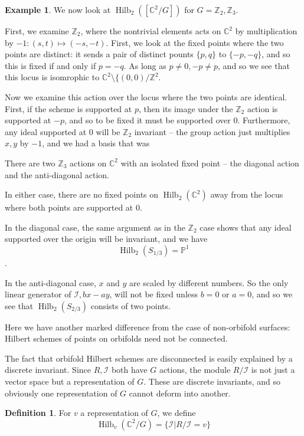 \documentclass{amsart}[12pt]
\theoremstyle{definition}
\newtheorem{example}[dummy]{Example}
\newtheorem{definition}[dummy]{Definition}
\newcommand{\Z}{\mathbb{Z}}
\newcommand{\C}{\mathbb{C}}
\newcommand{\proj}{\mathbb{P}}
\DeclareMathOperator{\Hilb}{Hilb}
\begin{document}
\begin{example}
We now look at $\Hilb_2([\C^2/G])$ for $G=\Z_2, \Z_3$.  

First, we examine $\Z_2$, where the nontrivial elements acts on $\C^2$ by multiplication by $-1: (s,t)\mapsto (-s,-t)$.  First, we look at the fixed points where the two points are distinct: it sends a pair of distinct pounts $\{p,q\}$ to $\{-p,-q\}$, and so this is fixed if and only if $p=-q$.  As long as $p\neq 0, -p\neq p$, and so we see that this locus is isomrophic to $\C^2\setminus\{(0,0)/\Z^2$.

Now we examine this action over the locus where the two points are identical.  First, if the scheme is supported at $p$, then its image under the $\Z_2$ action is supported at $-p$, and so to be fixed it must be supported over $0$.  Furthermore, any ideal supported at $0$ will be $\Z_2$ invariant -- the group action just multiplies $x, y$ by $-1$, and we had a basis that was

There are two $\Z_3$ actions on $\C^2$ with an isolated fixed point -- the diagonal action and the anti-diagonal action.

In either case, there are no fixed points on $\Hilb_2(\C^2)$ away from the locus where both points are supported at 0.  

In the diagonal case, the same argument as in the $\Z_2$ case shows that any ideal supported over the origin will be invariant, and we have
$$\Hilb_2(S_{1/3})=\proj^1$$.

In the anti-diagonal case, $x$ and $y$ are scaled by different numbers.  So the only linear generator of $\mathcal{I}, bx-ay$, will not be fixed unless $b=0$ or $a=0$, and so we see that $\Hilb_2(S_{2/3})$ consists of two points.  

Here we have another marked difference from the case of non-orbifold surfaces: Hilbert schemes of points on orbifolds need not be connected.

\end{example}

The fact that orbifold Hilbert schemes are disconnected is easily explained by a discrete invariant.  Since $R, \mathcal{I}$ both have $G$ actions, the module $R/\mathcal{I}$ is not just a vector space but a representation of $G$.  These are discrete invariants, and so obviously one representation of $G$ cannot deform into another.  

\begin{definition}
For $v$ a representation of $G$, we define
$$\Hilb_v(\C^2/G)=\{\mathcal{I}|R/\mathcal{I}=v\}$$
\end{definition}
\end{document}
